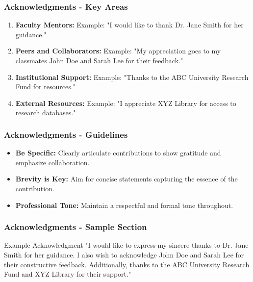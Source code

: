 \documentclass[aspectratio=169]{beamer}
\begin{document}
\begin{frame}[fragile]
    \frametitle{Acknowledgments - Key Areas}
    \begin{enumerate}
        \item \textbf{Faculty Mentors:} 
        Example: "I would like to thank Dr. Jane Smith for her guidance."
        
        \item \textbf{Peers and Collaborators:} 
        Example: "My appreciation goes to my classmates John Doe and Sarah Lee for their feedback."
        
        \item \textbf{Institutional Support:} 
        Example: "Thanks to the ABC University Research Fund for resources."
        
        \item \textbf{External Resources:} 
        Example: "I appreciate XYZ Library for access to research databases."
    \end{enumerate}
\end{frame}

\begin{frame}[fragile]
    \frametitle{Acknowledgments - Guidelines}
    \begin{itemize}
        \item \textbf{Be Specific:} Clearly articulate contributions to show gratitude and emphasize collaboration.
        
        \item \textbf{Brevity is Key:} Aim for concise statements capturing the essence of the contribution.
        
        \item \textbf{Professional Tone:} Maintain a respectful and formal tone throughout.
    \end{itemize}
\end{frame}

\begin{frame}[fragile]
    \frametitle{Acknowledgments - Sample Section}
    \begin{block}{Example Acknowledgment}
        "I would like to express my sincere thanks to Dr. Jane Smith for her guidance. I also wish to acknowledge John Doe and Sarah Lee for their constructive feedback. Additionally, thanks to the ABC University Research Fund and XYZ Library for their support."
    \end{block}
\end{frame}
\end{document}
